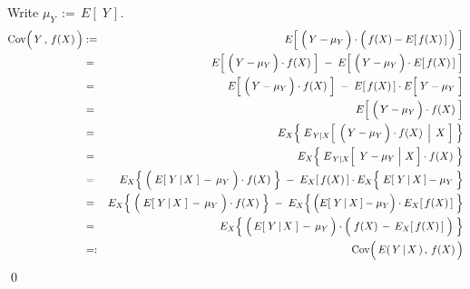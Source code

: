 \proof
Write $\mu_{Y} \,:=\, E\!\left[\;Y\,\right]$.
\begin{eqnarray*}
\Cov\!\left(\,\overset{{\color{white}.}}{Y}\,,\,f(X)\,\right)
&:=&
	E\!\left[\;\left(\,\overset{{\color{white}.}}{Y} - \mu_{Y}\,\right) \cdot \left(\,\overset{{\color{white}.}}{f}(X) - E[\,f(X)\,]\,\right)\;\right]
\\
&=&
	E\!\left[\;\left(\,\overset{{\color{white}.}}{Y} - \mu_{Y}\,\right) \cdot f(X)\;\right]
	\; - \;
	E\!\left[\;\left(\,\overset{{\color{white}.}}{Y} - \mu_{Y}\,\right) \cdot E[\,f(X)\,]\;\right]
\\
&=&
	E\!\left[\;\left(\,\overset{{\color{white}.}}{Y} - \mu_{Y}\,\right) \cdot f(X)\;\right]
	\; - \;
	E[\,f(X)\,] \cdot E\!\left[\;\overset{{\color{white}.}}{Y} - \mu_{Y}\;\right]
\\
&=&
	E\!\left[\;\left(\,\overset{{\color{white}.}}{Y} - \mu_{Y}\,\right) \cdot f(X)\;\right]
\\
&=&
	E_{X}\!\left\{\;
		E_{\,Y\vert X}\!\left[\;\left.\left(\,\overset{{\color{white}.}}{Y} - \mu_{Y}\,\right) \cdot f(X)\;\,\right\vert\;X\;\right]
	\;\right\}
\\
&=&
	E_{X}\!\left\{\;
		E_{\,Y\vert X}\!\left[\,\left.\,\overset{{\color{white}.}}{Y} - \mu_{Y}\;\right\vert\,X\,\right]
		\cdot
		f(X)
	\;\right\}
\\
&=&
	E_{X}\!\left\{\;
		\left(\;\overset{{\color{white}.}}{E}\!\left[\;Y\,\vert\,X\;\right] \,-\, \mu_{Y}\;\right)
		\cdot
		f(X)
	\;\right\}
	\; - \;
	E_{X}[\,f(X)\,] \cdot E_{X}\!\left\{\;\overset{{\color{white}.}}{E}[\;Y\,\vert\,X\,] - \mu_{Y}\;\right\}
\\
&=&
	E_{X}\!\left\{\;
		\left(\;\overset{{\color{white}.}}{E}\!\left[\;Y\,\vert\,X\;\right] \,-\, \mu_{Y}\;\right)
		\cdot
		f(X)
	\;\right\}
	\; - \;
	E_{X}\!\left\{\,\left(\overset{{\color{white}.}}{E}[\;Y\,\vert\,X\,] - \mu_{Y}\right) \cdot E_{X}[\,f(X)\,]\;\right\}
\\
&=&
	E_{X}\!\left\{\;
		\left(\,\overset{{\color{white}.}}{E}\!\left[\;Y\,\vert\,X\;\right] \,-\, \mu_{Y}\,\right)
		\cdot
		\left(\;\overset{{\color{white}.}}{f}(X)\,-\,E_{X}[\,f(X)\,]\;\right)
	\;\right\}
\\
&=:&
	\Cov\!\left(\,\overset{{\color{white}.}}{E}(\,Y\,\vert\,X\,)\,,\,f(X)\,\right)
\end{eqnarray*}
\qed

